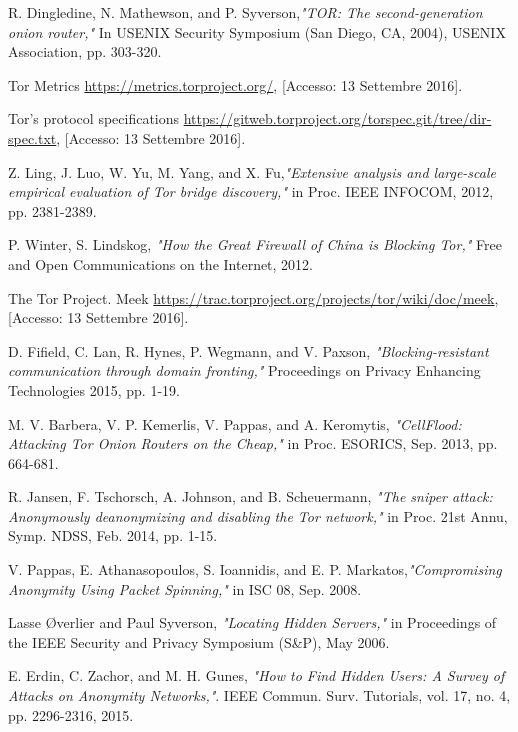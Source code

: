 
%

\begin{thebibliography}{9} 

 R. Dingledine, N. Mathewson, and P. Syverson,\textit{"TOR: The second-generation onion router,"} In USENIX Security Symposium (San Diego, CA, 2004), USENIX Association, pp. 303-320.

 Tor Metrics \url{https://metrics.torproject.org/}, [Accesso: 13 Settembre 2016].

 Tor's protocol specifications \url{https://gitweb.torproject.org/torspec.git/tree/dir-spec.txt}, [Accesso: 13 Settembre 2016].

 Z. Ling, J. Luo, W. Yu, M. Yang, and X. Fu,\textit{"Extensive analysis and large-scale empirical evaluation of Tor bridge discovery,"} in Proc. IEEE INFOCOM, 2012, pp. 2381-2389.

 P. Winter, S. Lindskog, \textit{"How the Great Firewall of China is Blocking Tor,"} Free and Open Communications on the Internet, 2012.

 The Tor Project. Meek \url{https://trac.torproject.org/projects/tor/wiki/doc/meek}, [Accesso: 13 Settembre 2016].

 D. Fifield, C. Lan, R. Hynes, P. Wegmann, and V. Paxson, \textit{"Blocking-resistant communication through domain fronting,"} Proceedings on Privacy Enhancing Technologies 2015, pp. 1-19.

 M. V. Barbera, V. P. Kemerlis, V. Pappas, and A. Keromytis, \textit{"CellFlood: Attacking Tor Onion Routers on the Cheap,"} in Proc. ESORICS, Sep. 2013, pp. 664-681.

 R. Jansen, F. Tschorsch, A. Johnson, and B. Scheuermann, \textit{"The sniper attack: Anonymously deanonymizing and disabling the Tor network,"} in Proc. 21st Annu, Symp. NDSS, Feb. 2014, pp. 1-15.

 V. Pappas, E. Athanasopoulos, S. Ioannidis, and E. P. Markatos,\textit{"Compromising Anonymity Using Packet Spinning,"} in ISC 08, Sep. 2008.

 Lasse {\O}verlier and Paul Syverson, \textit{"Locating Hidden Servers,"} in Proceedings of the IEEE Security and Privacy Symposium (S\&P), May 2006.

 E. Erdin, C. Zachor, and M. H. Gunes, \textit{"How to Find Hidden Users: A Survey of Attacks on Anonymity Networks,"}. IEEE Commun. Surv. Tutorials, vol. 17, no. 4, pp. 2296-2316, 2015.

\end{thebibliography}